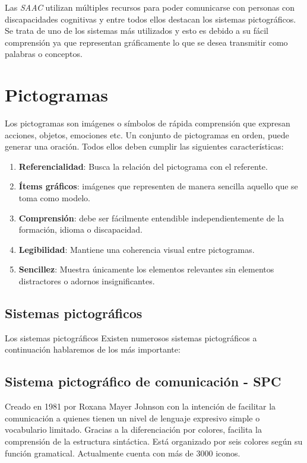 Las \textit{SAAC} utilizan múltiples recursos para poder comunicarse con personas con discapacidades cognitivas y entre todos ellos destacan los sistemas pictográficos. Se trata de uno de los sistemas más utilizados y esto es debido a su fácil comprensión ya que representan gráficamente lo que se desea transmitir como palabras o conceptos. 

\section{Pictogramas}
Los pictogramas son imágenes o símbolos de rápida comprensión que expresan acciones, objetos, emociones etc. Un conjunto de pictogramas en orden, puede generar una oración. Todos ellos deben cumplir las siguientes características:
\begin{enumerate}
	\item \textbf{Referencialidad}: Busca la relación del pictograma con el referente.
	\item \textbf{Ítems gráficos}: imágenes que representen de manera sencilla aquello que se toma como modelo.
	\item \textbf{Comprensión}: debe ser fácilmente entendible independientemente de la formación, idioma o discapacidad.
	\item \textbf{Legibilidad}: Mantiene una coherencia visual entre pictogramas.
	\item \textbf{Sencillez}: Muestra únicamente los elementos relevantes sin elementos distractores o adornos insignificantes.
\end{enumerate}

\subsection*{Sistemas pictográficos}
Los sistemas pictográficos 
Existen numerosos sistemas pictográficos a continuación hablaremos de los más importante:

\subsection{Sistema pictográfico de comunicación - SPC}

Creado en 1981 por Roxana Mayer Johnson con la intención de facilitar la comunicación a quienes tienen un nivel de lenguaje expresivo simple o vocabulario limitado. Gracias a la diferenciación por colores, facilita la comprensión de la estructura sintáctica. Está organizado por seis colores según su función gramatical. Actualmente cuenta con más de 3000 iconos.

